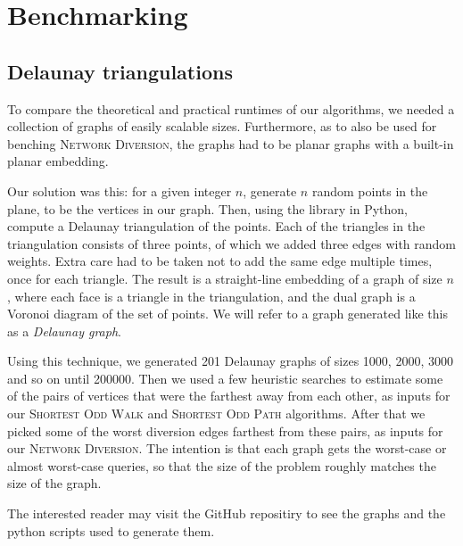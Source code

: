 \section{Benchmarking}


\subsection{Delaunay triangulations}
\label{subsection:delaunay}
To compare the theoretical and practical runtimes of our algorithms, we needed a collection of graphs of easily scalable sizes. Furthermore, as to also be used for benching \textsc{Network Diversion}, the graphs had to be planar graphs with a built-in planar embedding.

Our solution was this: for a given integer $n$, generate $n$ random points in the plane, to be the vertices in our graph. Then, using the  library in Python, compute a Delaunay triangulation of the points. Each of the triangles in the triangulation consists of three points, of which we added three edges with random weights. Extra care had to be taken not to add the same edge multiple times, once for each triangle. The result is a straight-line embedding of a graph of size $n$, where each face is a triangle in the triangulation, and the dual graph is a Voronoi diagram of the set of points. We will refer to a graph generated like this as a \emph{Delaunay graph}.

Using this technique, we generated 201 Delaunay graphs of sizes 1000, 2000, 3000 and so on until 200000. Then we used a few heuristic searches to estimate some of the pairs of vertices that were the farthest away from each other, as inputs for our \textsc{Shortest Odd Walk} and \textsc{Shortest Odd Path} algorithms. After that we picked some of the worst diversion edges farthest from these pairs, as inputs for our \textsc{Network Diversion}. The intention is that each graph gets the worst-case or almost worst-case queries, so that the size of the problem roughly matches the size of the graph.

The interested reader may visit the GitHub repositiry \cite{source:codebase} to see the graphs and the python scripts used to generate them.

